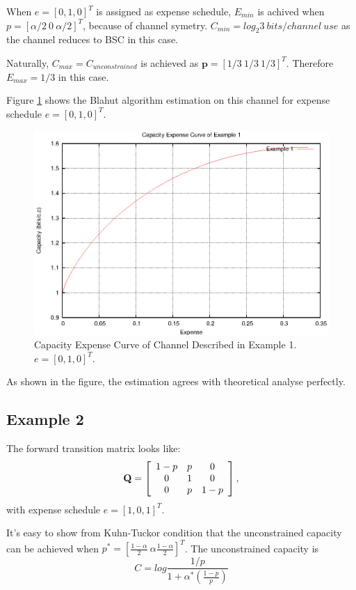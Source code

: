 \documentclass[a4paper,10pt]{article}
\begin{document}
When $e=[0,1,0]^T$ is assigned as expense schedule, $E_{min}$ is achived when $p=[\alpha/2\ 0\ \alpha/2]^T$, because of channel symetry. $C_{min}=log_2{3}\ bits/channel\ use$ as the channel reduces to BSC in this case.

Naturally, $C_{max}=C_{unconstrained}$ is achieved as $\mathbf{p}=[1/3\ 1/3\ 1/3]^T$. Therefore $E_{max}=1/3$ in this case.

Figure \ref{fig:example1_cap} shows the Blahut algorithm estimation on this channel for expense schedule $e=[0,1,0]^T$.
\begin{figure}
 \centering
 \includegraphics{pic/example1_cap.eps}
 \caption{Capacity Expense Curve of Channel Described in Example 1. $e=[0,1,0]^T$.}
 \label{fig:example1_cap}
\end{figure}
As shown in the figure, the estimation agrees with theoretical analyse perfectly.

\subsection{Example 2}
The forward transition matrix looks like:
\begin{displaymath}
\mathbf{Q}=\left[ 
\begin{array}[c]{ccc}
1-p & p & 0 \\ 
0 & 1 & 0 \\ 
0 & p & 1-p
\end{array}\right], 
\end{displaymath}
with expense schedule $e=[1,0,1]^T$.

It's easy to show from Kuhn-Tuckor condition that the unconstrained capacity can be achieved when $p^*=[\frac{1-\alpha}{2}\ \alpha \frac{1-\alpha}{2}]^T$. The unconstrained capacity is
\begin{equation}
 C=log{\frac{1/p}{1+\alpha^*\left(\frac{1-p}{p}\right)}}
\end{equation}
\end{document}
